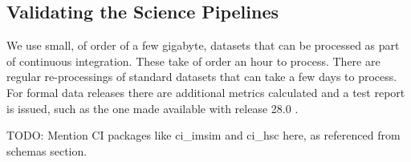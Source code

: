 \subsection{Validating the Science Pipelines}
\label{sec:validation}

We use small, of order of a few gigabyte, datasets that can be processed as part of continuous integration.
These take of order an hour to process.
There are regular re-processings of standard datasets that can take a few days to process.
For formal data releases there are additional metrics calculated and a test report is issued, such as the one made available with release 28.0 \citep{DMTR-451}.

TODO: Mention CI packages like ci\_imsim and ci\_hsc here, as referenced from schemas section.



